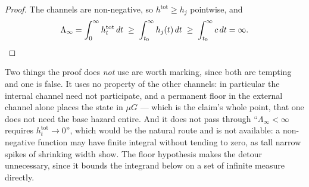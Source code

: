 \documentclass[11pt]{article}
\numberwithin{equation}{section}
\theoremstyle{plain}
\theoremstyle{definition}
\theoremstyle{remark}
\begin{document}
\begin{proof}
The channels are non-negative, so $h^{\mathrm{tot}}\ge h_j$ pointwise,
and
\[
\Lambda_\infty=\int_0^{\infty}h^{\mathrm{tot}}_t\,dt
\;\ge\;\int_{t_0}^{\infty}h_j(t)\,dt
\;\ge\;\int_{t_0}^{\infty}c\,dt=\infty. \qedhere
\]
\end{proof}

\noindent Two things the proof does \emph{not} use are worth marking,
since both are tempting and one is false. It uses no property of the
other channels: in particular the internal channel need not
participate, and a permanent floor in the external channel alone
places the state in $\mu G$ --- which is the claim's whole point, that
one does not need the base hazard entire. And it does not pass through
``$\Lambda_\infty<\infty$ requires $h^{\mathrm{tot}}_t\to0$'', which
would be the natural route and is not available: a non-negative
function may have finite integral without tending to zero, as tall
narrow spikes of shrinking width show. The floor hypothesis makes the
detour unnecessary, since it bounds the integrand below on a set of
infinite measure directly.
\end{document}
